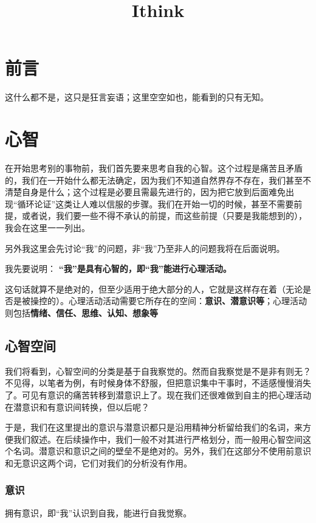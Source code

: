 \documentclass[fontset=windows, 12pt, a4paper]{article}
\date{}
\title{Ithink}
\begin{document}
\maketitle

\section*{前言}
这什么都不是，这只是狂言妄语；这里空空如也，能看到的只有无知。


\section{心智}

在开始思考别的事物前，我们首先要来思考自我的心智。这个过程是痛苦且矛盾的，我们在一开始什么都无法确定，因为我们不知道自然界存不存在，我们甚至不清楚自身是什么；这个过程是必要且需最先进行的，因为把它放到后面难免出现“循环论证”这类让人难以信服的步骤。我们在开始一切的时候，甚至不需要前提，或者说，我们要一些不得不承认的前提，而这些前提（只要是我能想到的），我会在这里一一列出。

另外我这里会先讨论“我”的问题，非“我”乃至非人的问题我将在后面说明。

我先要说明：
\textbf{“我”是具有心智的，即“我”能进行心理活动。}

这句话就算不是绝对的，但至少适用于绝大部分的人，它就是这样存在着（无论是否是被操控的）。心理活动活动需要它所存在的空间：\textbf{意识、潜意识等}；心理活动则包括\textbf{情绪、信任、思维、认知、想象等}

\subsection{心智空间}
我们将看到，心智空间的分类是基于自我察觉的。然而自我察觉是不是非有则无？不见得，以笔者为例，有时候身体不舒服，但把意识集中干事时，不适感慢慢消失了。可见有意识的痛苦转移到潜意识上了。现在我们还很难做到自主的把心理活动在潜意识和有意识间转换，但以后呢？

于是，我们在这里提出的意识与潜意识都只是沿用精神分析留给我们的名词，来方便我们叙述。在后续操作中，我们一般不对其进行严格划分，而一般用心智空间这个名词。潜意识和意识之间的壁垒不是绝对的。另外，我们在这部分不使用前意识和无意识这两个词，它们对我们的分析没有作用。

\subsubsection{意识}
拥有意识，即“我”认识到自我，能进行自我觉察。
\end{document}
